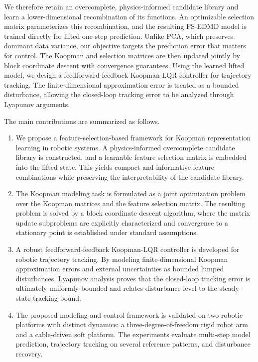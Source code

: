 We therefore retain an overcomplete, physics-informed candidate library and
learn a lower-dimensional recombination of its functions. An optimizable
selection matrix parameterizes this recombination, and the resulting FS-EDMD
model is trained directly for lifted
one-step prediction. Unlike PCA, which preserves dominant data variance, our
objective targets the prediction error that matters for control. The Koopman and
selection matrices are then updated jointly by block coordinate descent with
convergence guarantees. Using the learned lifted model, we design a
feedforward-feedback Koopman-LQR controller for trajectory tracking. The
finite-dimensional approximation error is treated as a bounded disturbance,
allowing the closed-loop tracking error to be analyzed through Lyapunov
arguments.

The main contributions are summarized as follows.
{\renewcommand{\labelenumi}{(\arabic{enumi})}
\begin{enumerate}
\item We propose a feature-selection-based framework for Koopman
representation learning in robotic systems. A physics-informed overcomplete
candidate library is constructed, and a learnable feature selection matrix is
embedded into the lifted state. This yields compact and informative feature
combinations while preserving the interpretability of the candidate library.

\item The Koopman modeling task is formulated as a joint optimization problem
over the Koopman matrices and the feature selection matrix. The resulting
problem is solved by a block coordinate descent algorithm, where the matrix
update subproblems are explicitly characterized and convergence to a
stationary point is established under standard assumptions.

\item A robust feedforward-feedback Koopman-LQR controller is developed for
robotic trajectory tracking. By modeling finite-dimensional Koopman
approximation errors and external uncertainties as bounded lumped
disturbances, Lyapunov analysis proves that the closed-loop tracking error is
ultimately uniformly bounded and relates disturbance level to the
steady-state tracking bound.

\item The proposed modeling and control framework is validated on two robotic
platforms with distinct dynamics: a three-degree-of-freedom rigid robot arm and
a cable-driven soft platform. The experiments evaluate multi-step model
prediction, trajectory tracking on several reference patterns, and disturbance
recovery.
\end{enumerate}}

